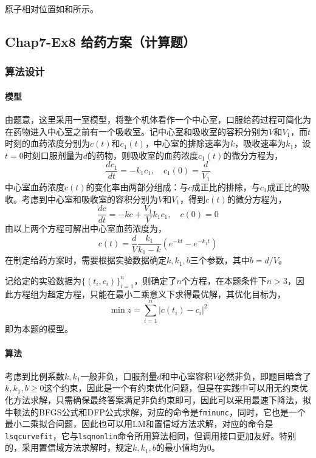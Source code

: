 \documentclass[12pt,a4paper]{article}
\begin{document}
原子相对位置如和所示。

\subsection{Chap7-Ex8 给药方案（计算题）}

\subsubsection{算法设计}

\paragraph{模型} 由题意，这里采用一室模型，将整个机体看作一个中心室，口服给药过程可简化为在药物进入中心室之前有一个吸收室。记中心室和吸收室的容积分别为$V$和$V_1$，而$t$时刻的血药浓度分别为$c(t)$和$c_1(t)$，中心室的排除速率为$k$，吸收速率为$k_1$，设$t=0$时刻口服剂量为$d$的药物，则吸收室的血药浓度$c_1(t)$的微分方程为，
\begin{equation}
    \frac{dc_1}{dt} = -k_1 c_1, \quad c_1(0) = \frac{d}{V_1}
\end{equation}
中心室血药浓度$c(t)$的变化率由两部分组成：与$c$成正比的排除，与$c_1$成正比的吸收。考虑到中心室和吸收室的容积分别为$V$和$V_1$，得到$c(t)$的微分方程为，
\begin{equation}
    \frac{dc}{dt} = -kc + \frac{V_1}{V}k_1 c_1, \quad c(0) = 0
\end{equation}
由以上两个方程可解出中心室血药浓度为，
\begin{equation}
    c(t) = \frac{d}{V}\frac{k_1}{k_1 - k}(e^{-kt} - e^{-k_1 t})
\end{equation}
在制定给药方案时，需要根据实验数据确定$k, k_1, b$三个参数，其中$b=d/V$。

记给定的实验数据为$\{(t_i, c_i)\}_{i=1}^n$，则确定了$n$个方程，在本题条件下$n>3$，因此方程组为超定方程，只能在最小二乘意义下求得最优解，其优化目标为，
\begin{equation}\label{eq:ex8_model}
    \min z = \sum_{i=1}^n\left|c(t_i) - c_i\right|^2
\end{equation}
即为本题的模型。

\paragraph{算法} 考虑到比例系数$k, k_1$一般非负，口服剂量$d$和中心室容积$V$必然非负，即题目暗含了$k,k_1, b \ge 0$这个约束，因此是一个有约束优化问题，但是在实践中可以用无约束优化方法求解，只需确保最终答案满足非负约束即可，因此可以采用最速下降法，拟牛顿法的BFGS公式和DFP公式求解，对应的命令是\texttt{fminunc}，同时，它也是一个最小二乘拟合问题，因此也可以用LM和置信域方法求解，对应的命令是\texttt{lsqcurvefit}，它与\texttt{lsqnonlin}命令所用算法相同，但调用接口更加友好。特别的，采用置信域方法求解时，规定$k,k_1,b$的最小值均为0。
\end{document}
